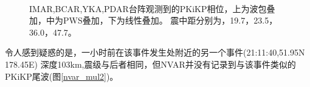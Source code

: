\begin{figure}[tbph]
\centering
{}
\hspace{2em}
\\
\hspace{2em}
\caption{IMAR,BCAR,YKA,PDAR台阵观测到的PKiKP相位，上为波包叠加，中为PWS叠加，下为线性叠加。%
震中距分别为，19.7{\textdegree}，23.5{\textdegree}，36.0{\textdegree}，47.7{\textdegree}。}
\label{others}
\end{figure}

令人感到疑惑的是，一小时前在该事件发生处附近的另一个事件(21:11:40,51.95N 178.45E)
深度103km,震级与后者相同，但NVAR并没有记录到与该事件类似的PKiKP尾波(图\ref{nvar_mul2})。

